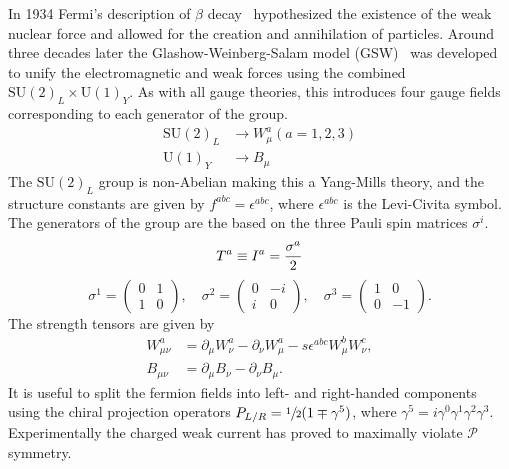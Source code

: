 In 1934 Fermi's description of $\beta$ decay~\cite{Fermi1934} hypothesized the existence of the weak nuclear force and allowed for the creation and annihilation of particles.
Around three decades later the Glashow-Weinberg-Salam model (GSW)~\cite{Glashow1961, Weinberg1967,Salam1964} was developed to unify the electromagnetic and weak forces using the combined $\text{SU}(2)_L \times \text{U}(1)_Y$.
As with all gauge theories, this introduces four gauge fields corresponding to each generator of the group.
\begin{align}
    \text{SU}(2)_L & \rightarrow W_\mu^a(a = 1, 2, 3) \\
    \text{U}(1)_Y  & \rightarrow B_\mu
\end{align}
The $\text{SU}(2)_L$ group is non-Abelian making this a Yang-Mills theory, and the structure constants are given by $f^{abc} = \epsilon^{abc}$, where $\epsilon^{abc}$ is the Levi-Civita symbol.
The generators of the group are the based on the three Pauli spin matrices $\sigma^i$.
\begin{equation}
    \label{eq:su2_generators}
    T^a \equiv I^a = \frac{\sigma^a}{2} \\
\end{equation}
\begin{equation}
    \sigma^1 = \begin{pmatrix} 0 & 1 \\ 1 & 0 \end{pmatrix},
    \quad \sigma^2 = \begin{pmatrix} 0 & -i \\ i & 0 \end{pmatrix},
    \quad \sigma^3 = \begin{pmatrix} 1 & 0 \\ 0 & -1 \end{pmatrix}.
    \label{eq:pauli_matrices}
\end{equation}
The strength tensors are given by
\begin{align}
    \label{eq:ew_field_strength_tensors}
    W_{\mu\nu}^a & = \partial_\mu W_\nu^a - \partial_\nu W_\mu^a - s \epsilon^{abc} W_\mu^b W_\nu^c, \\
    B_{\mu\nu}   & = \partial_\mu B_\nu - \partial_\nu B_\mu.
\end{align}
It is useful to split the fermion fields into left- and right-handed components using the chiral projection operators $P_{L/R} = \sfrac{1}{2} (1 \mp \gamma^5)$, where $\gamma^5 = i \gamma^0 \gamma^1 \gamma^2 \gamma^3$.
Experimentally the charged weak current has proved to maximally violate $\mathcal{P}$ symmetry.
